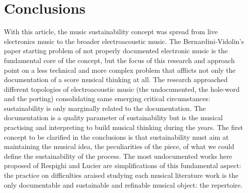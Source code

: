 \documentclass[twoside,a4paper]{article}
\begin{document}
%
%
%
%
%
%
%

\section{Conclusions}

With this article, the music sustainability concept was spread from live electronics music to the broader electroacoustic music. The Bernardini-Vidolin's paper starting problem of not properly documented electronic music is the fundamental core of the concept, but the focus of this research and approach point on a less technical and more complex problem that afflicts not only the documentation of a score musical thinking at all. The research approached different topologies of electroacoustic music (the undocumented, the hole-word and the porting) consolidating same emerging critical circumstances: sustainability is only marginally related to the documentation. The documentation is a quality parameter of sustainability but is the musical practising and interpreting to build musical thinking during the years. The first concept to be clarified in the conclusions is that sustainability must aim at maintaining the musical idea, the peculiarities of the piece, of what we could define the sustainability of the process. The most undocumented works here proposed of Respighi and Lucier are simplifications of this fundamental aspect: the practice on difficulties araised studying each musical literature work is the only documentable and sustainable and refinable musical object: the repertoire.
\end{document}
